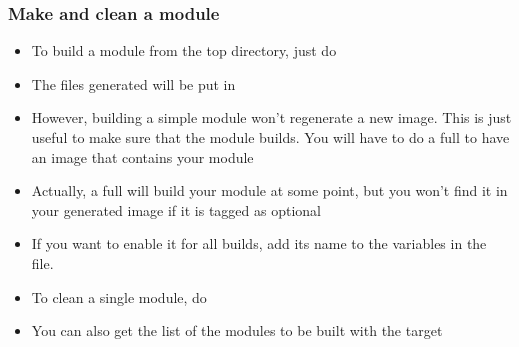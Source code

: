 \begin{frame}
  \frametitle{Make and clean a module}
  \begin{itemize}
  \item To build a module from the top directory, just do
  \item The files generated will be put in
  \item However, building a simple module won't regenerate a new image.
    This is just useful to make sure that the module builds.
    You will have to do a full  to have an image that contains
    your module
  \item Actually, a full  will build your module at some
    point, but you won't find it in your generated image if it is
    tagged as optional
  \item If you want to enable it for all builds, add its name to the
     variables in the
     file.
  \item To clean a single module, do 
  \item You can also get the list of the modules to be built with the
     target
  \end{itemize}
\end{frame}

